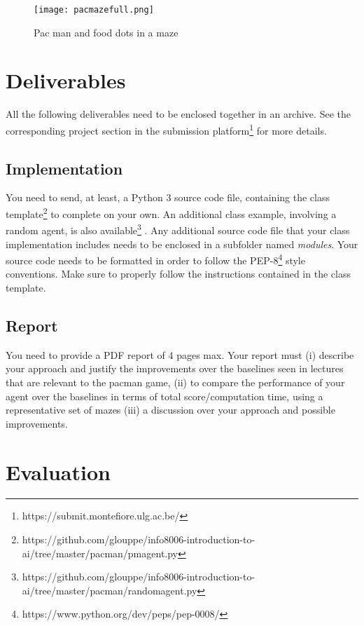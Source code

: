 \documentclass[12pt,a4paper,BCOR12mm, headexclude, footexclude, twoside, openright]{scrartcl}
\numberwithin{equation}{section} %
\numberwithin{figure}{section} %
\numberwithin{table}{section} %
\begin{document}
\begin{figure}
	\label{fullmaze}
	\begin{center}

	\texttt{[image: pacmazefull.png]}
    \caption{Pac man and food dots in a maze}
    \end{center}
\end{figure}

\section{Deliverables}

All the following deliverables need to be enclosed together in an archive. See the corresponding project section in the submission platform\footnote{https://submit.montefiore.ulg.ac.be/} for more details.

\subsection{Implementation}

You need to send, at least, a Python 3 source code file, containing the class template\footnote{https://github.com/glouppe/info8006-introduction-to-ai/tree/master/pacman/pmagent.py} to complete on your own. An additional class example, involving a random agent, is also available\footnote{https://github.com/glouppe/info8006-introduction-to-ai/tree/master/pacman/randomagent.py} . Any additional source code file that your class implementation includes needs to be enclosed in a subfolder named \emph{modules}. Your source code needs to be formatted in order to follow the PEP-8\footnote{https://www.python.org/dev/peps/pep-0008/} style conventions. Make sure to properly follow the instructions contained in the class template. 

\subsection{Report}

You need to provide a PDF report of 4 pages max. Your report must (i) describe your approach and justify the improvements over the baselines seen in lectures that are relevant to the pacman game, (ii) to compare the performance of your agent over the baselines in terms of total score/computation time, using a representative set of mazes (iii) a discussion over your approach and possible improvements.  


\section{Evaluation}
\end{document}
